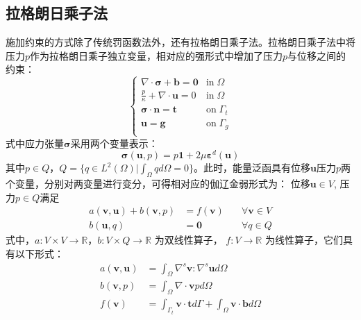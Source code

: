\subsection{拉格朗日乘子法}
施加约束的方式除了传统罚函数法外，还有拉格朗日乘子法。拉格朗日乘子法中将压力$p$作为拉格朗日乘子独立变量，相对应的强形式中增加了压力$p$与位移之间的约束：
\begin{equation}\label{strong_mix}
    \begin{cases}
        \nabla \cdot \boldsymbol \sigma + \boldsymbol b = \boldsymbol 0 & \mathrm{in} \; \Omega \\
        \frac{p}{\kappa} + \nabla \cdot \boldsymbol u = 0 & \mathrm{in} \; \Omega \\
        \boldsymbol \sigma \cdot \boldsymbol n = \boldsymbol t & \mathrm{on} \; \Gamma_t \\
        \boldsymbol u = \boldsymbol g & \mathrm{on} \; \Gamma_g \\
    \end{cases}
\end{equation}
式中应力张量$\boldsymbol \sigma$采用两个变量表示：
\begin{equation}\label{stress_mix}
    \boldsymbol \sigma(\boldsymbol u, p) = p \boldsymbol 1 + 2\mu \boldsymbol \varepsilon^d(\boldsymbol u)
\end{equation}
其中$p\in Q$，$Q = \{q \in L^2(\Omega) \vert \int_{\Omega} q d\Omega = 0\}$。此时，能量泛函具有位移$\boldsymbol u$压力$p$两个变量，分别对两变量进行变分，可得相对应的伽辽金弱形式为：
位移$\boldsymbol u \in V$, 压力$p \in Q$满足
\begin{equation}\label{weak_mix}
    \begin{aligned}
        a(\boldsymbol v, \boldsymbol u) + b(\boldsymbol v, p) &= f(\boldsymbol v) \quad &\forall \boldsymbol v \in V \\
        b(\boldsymbol u, q) &= \boldsymbol 0 \quad &\forall q \in Q
    \end{aligned}
\end{equation}
式中，$a: V\times V\rightarrow \mathbb R$，$b: V\times Q\rightarrow \mathbb R$ 为双线性算子， $f: V \rightarrow \mathbb R$ 为线性算子，它们具有以下形式：
\begin{align}
    a(\boldsymbol v, \boldsymbol u) &= \int_\Omega \nabla^s \boldsymbol v : \nabla^s \boldsymbol u d\Omega \\
    b(\boldsymbol v, p) &= \int_\Omega \nabla \cdot \boldsymbol v p d\Omega \\
    f(\boldsymbol v) &= \int_{\Gamma_t} \boldsymbol v \cdot \boldsymbol t d\Gamma + \int_{\Omega} \boldsymbol v \cdot \boldsymbol b d\Omega
\end{align}

